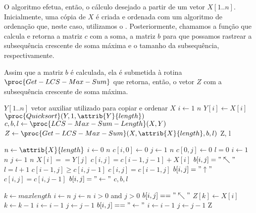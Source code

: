 O algoritmo  efetua, então, o cálculo desejado a partir de um vetor $X[1..n]$. Inicialmente, uma cópia de $X$ é criada e ordenada com um algoritmo de ordenação que, neste caso, utilizamos o . Posteriormente, chamamos a função  que calcula e retorna a matriz $c$ com a soma, a matriz $b$ para que possamos rastrear a subsequência crescente de soma máxima e o tamanho da subsequência, respectivamente.

Assim que a matriz $b$ é calculada, ela é submetida à rotina $\proc{Get-LCS-Max-Sum}$ que retorna, então, o vetor $Z$ com a subsequência crescente de soma máxima.

\begin{codebox}
\li $Y[1..n]$ vetor auxiliar utilizado para copiar e ordenar $X$
\li \For $i \gets 1$ \To $n$
\li \Do
        $Y[i] \gets X[i]$
    \End
\li $\proc{Quicksort}(Y, 1, \attrib{Y}{length})$
\li	$c, b, l \gets \proc{LCS-Max-Sum-Length}(X, Y)$
\li	$Z \gets \proc{Get-LCS-Max-Sum}(X, \attrib{X}{length}, b, l)$
\li \Return Z, l
\end{codebox}

\begin{codebox}
\li $n \gets \attrib{X}{length}$
\li \For $i \gets 0$ \To $n$
\li \Do
        $c[i, 0] \gets 0$
    \End
\li \For $j \gets 1$ \To $n$
\li \Do
        $c[0, j] \gets 0$
    \End
\li $l = 0$
\li \For $i \gets 1$ \To $n$
\li \Do
        \For $j \gets 1$ \To $n$
\li     \Do
            \If $X[i] == Y[j]$
\li         \Then
                $c[i,j] = c[i-1, j-1] + X[i]$
\li             $b[i,j] = "\nwarrow"$
\li             $l = l + 1$
\li         \ElseIf $c[i-1, j] \ge c[i, j-1]$
\li         \Then
                $c[i,j] = c[i-1, j]$
\li             $b[i,j] = "\uparrow"$
\li         \Else
                $c[i,j] = c[i, j-1]$
\li             $b[i,j] = "\leftarrow"$
            \End
        \End
    \End
\li \Return $c, b, l$
\end{codebox}

\begin{codebox}
\li $k \gets maxlength$
\li $i \gets n$
\li $j \gets n$
\li \While $i > 0$ and $j > 0$
\li \Do
        \If $b[i,j] == "\nwarrow"$
\li     \Then
            $Z[k] \gets X[i]$
\li         $k \gets k-1$
\li         $i \gets i-1$
\li         $j \gets j-1$
\li     \ElseIf $b[i,j] == "\leftarrow"$
\li     \Then
            $i \gets i-1$
\li     \Else
            $j \gets j-1$
        \End     
    \End
\li \Return Z
\end{codebox}

